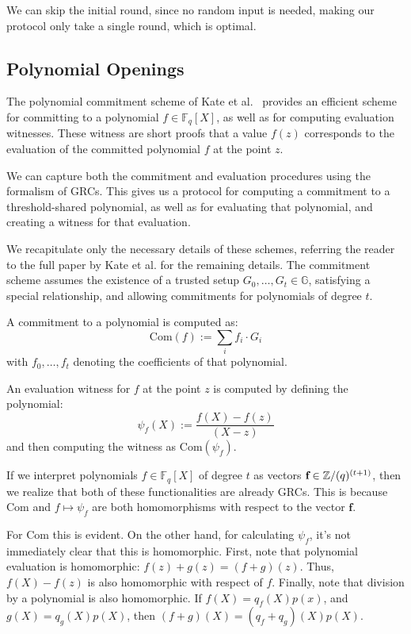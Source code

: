We can skip the initial round, since no random input is needed,
making our protocol only take a single round, which is optimal.

\subsection{Polynomial Openings}

The polynomial commitment scheme of Kate et al.~\cite{kate_constant-size_2010}
provides an efficient scheme for committing to a polynomial
$f \in \mathbb{F}_q[X]$, as well as for computing evaluation witnesses.
These witness are short proofs that a value $f(z)$ corresponds
to the evaluation of the committed polynomial $f$ at the point $z$.

We can capture both the commitment and evaluation procedures
using the formalism of GRCs.
This gives us a protocol for computing a commitment to a
threshold-shared polynomial, as well as for evaluating that polynomial,
and creating a witness for that evaluation.

We recapitulate only the necessary details of these schemes,
referring the reader to the full paper by Kate et al. for the remaining
details.
The commitment scheme assumes the existence of a trusted
setup $G_0, \ldots, G_t \in \mathbb{G}$, satisfying a special relationship,
and allowing commitments for polynomials of degree $t$.

A commitment to a polynomial is computed as:
$$
\text{Com}(f) := \sum_i f_i \cdot G_i
$$
with $f_0, \ldots, f_t$ denoting the coefficients of that polynomial.

An evaluation witness for $f$ at the point $z$ is computed by defining
the polynomial:
$$
\psi_f(X) := \frac{f(X) - f(z)}{(X - z)}
$$
and then computing the witness as $\text{Com}(\psi_f)$.

If we interpret polynomials $f \in \mathbb{F}_q[X]$ of degree $t$
as vectors $\textbf{f} \in \mathbb{Z}/(q)^{(t + 1)}$, 
then we realize that both of these functionalities are already
GRCs.
This is because $\text{Com}$ and $f \mapsto \psi_f$ are both
homomorphisms with respect to the vector $\textbf{f}$.

For $\text{Com}$ this is evident.
On the other hand, for calculating $\psi_f$, it's not immediately
clear that this is homomorphic.
First, note that polynomial evaluation is homomorphic:
$f(z) + g(z) = (f + g)(z)$.
Thus, $f(X) - f(z)$ is also homomorphic with respect of $f$.
Finally, note that division by a polynomial is also homomorphic.
If $f(X) = q_f(X) p(x)$, and $g(X) = q_g(X) p(X)$, then $(f + g)(X) = (q_f + q_g)(X) p(X)$.

